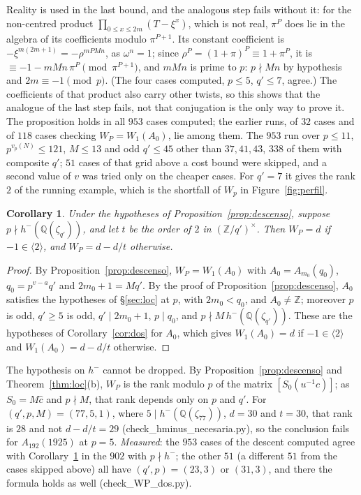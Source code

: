 \documentclass[11pt,a4paper]{article}
\newtheorem{corollary}[theorem]{Corollary}
\theoremstyle{definition}
\newcommand{\ZZ}{\mathbb{Z}}
\newcommand{\QQ}{\mathbb{Q}}
\begin{document}
\noindent Reality is used in the last bound, and the analogous step fails without it: for the non-centred product
$\prod_{0\le x\le 2m}(T-\xi^x)$, which is not real, $\pi^P$ does lie in the algebra of its coefficients modulo
$\pi^{P+1}$. Its constant coefficient is $-\xi^{m(2m+1)}=-\rho^{mPMn}$, as $\omega^n=1$; since
$\rho^P=(1+\pi)^P\equiv1+\pi^P$, it is $\equiv-1-mMn\,\pi^P\pmod{\pi^{P+1}}$, and $mMn$ is prime to $p$: $p\nmid Mn$ by
hypothesis and $2m\equiv-1\pmod p$. (The four cases computed, $p\le5$, $q'\le7$, agree.) The coefficients of that
product also carry other twists, so this shows that the analogue of the last step fails, not that conjugation is the
only way to prove it.
The proposition holds in all $953$ cases computed; the earlier runs, of $32$ cases and of $118$ cases checking
$W_P=W_1(A_0)$, lie among them. The
$953$ run over $p\le11$, $p^{v_p(N)}\le121$, $M\le13$ and odd $q'\le45$ other than $37,41,43$, $338$ of them with
composite $q'$; $51$ cases of that grid above a cost bound were skipped, and a second value of $v$ was tried only on the
cheaper cases. For $q'=7$ it gives the
rank $2$ of the running example, which is the shortfall of $W_p$ in Figure~\ref{fig:perfil}.

\begin{corollary}\label{cor:WPdos}
Under the hypotheses of Proposition~\ref{prop:descenso}, suppose $p\nmid h^-(\QQ(\zeta_{q'}))$, and let $t$ be the
order of $2$ in $(\ZZ/q')^\times$. Then $W_P=d$ if $-1\in\langle2\rangle$, and $W_P=d-d/t$ otherwise.
\end{corollary}

\begin{proof}
By Proposition~\ref{prop:descenso}, $W_P=W_1(A_0)$ with $A_0=A_{m_0}(q_0)$, $q_0=p^{v-a}q'$ and $2m_0+1=Mq'$. By the proof of
Proposition~\ref{prop:descenso}, $A_0$ satisfies the hypotheses of \S\ref{sec:loc} at $p$, with $2m_0<q_0$, and
$A_0\ne\ZZ$; moreover $p$ is odd, $q'\ge5$ is odd, $q'\mid2m_0+1$, $p\mid q_0$, and $p\nmid M\,h^-(\QQ(\zeta_{q'}))$.
These are the hypotheses of Corollary~\ref{cor:dos} for $A_0$, which gives $W_1(A_0)=d$ if $-1\in\langle2\rangle$ and
$W_1(A_0)=d-d/t$ otherwise.
\end{proof}

\noindent The hypothesis on $h^-$ cannot be dropped. By Proposition~\ref{prop:descenso} and Theorem~\ref{thm:loc}(b),
$W_P$ is the rank modulo $p$ of the matrix $[S_0(u^{-1}c)]$; as $S_0=M\hat c$ and $p\nmid M$, that rank depends
only on $p$ and $q'$. For
$(q',p,M)=(77,5,1)$, where $5\mid h^-(\QQ(\zeta_{77}))$, $d=30$ and $t=30$, that rank is $28$ and not $d-d/t=29$
({\ttfamily check\_hminus\_necesaria.py}), so the conclusion fails for $A_{192}(1925)$ at $p=5$. \emph{Measured}:
the $953$ cases of the descent computed agree with Corollary~\ref{cor:WPdos} in the $902$ with $p\nmid h^-$; the other
$51$ (a different $51$ from the cases skipped above) all have $(q',p)=(23,3)$ or $(31,3)$, and there the formula holds as well ({\ttfamily check\_WP\_dos.py}).
\end{document}
